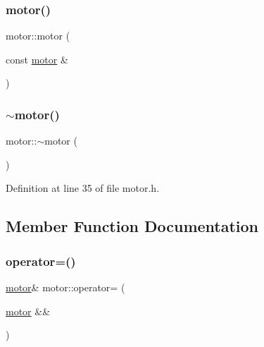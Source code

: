 \subsubsection{\texorpdfstring{motor()}{motor()}\hspace{0.1cm}{\footnotesize\ttfamily [4/4]}}
{\footnotesize\ttfamily motor\+::motor (\begin{DoxyParamCaption}\item[{const \mbox{\hyperlink{classmotor}{motor}} \&}]{ }\end{DoxyParamCaption})\hspace{0.3cm}{\ttfamily [default]}}

\mbox{\label{classmotor_ae7c05cf12983ab16ecdfe8e34c4c7ffa}} 
\subsubsection{\texorpdfstring{$\sim$motor()}{~motor()}}
{\footnotesize\ttfamily motor\+::$\sim$motor (\begin{DoxyParamCaption}{ }\end{DoxyParamCaption})\hspace{0.3cm}{\ttfamily [inline]}}



Definition at line 35 of file motor.\+h.



\subsection{Member Function Documentation}
\mbox{\label{classmotor_a56c0ac07ae4fe630290c25415f36f828}} 
\subsubsection{\texorpdfstring{operator=()}{operator=()}\hspace{0.1cm}{\footnotesize\ttfamily [1/2]}}
{\footnotesize\ttfamily \mbox{\hyperlink{classmotor}{motor}}\& motor\+::operator= (\begin{DoxyParamCaption}\item[{\mbox{\hyperlink{classmotor}{motor}} \&\&}]{ }\end{DoxyParamCaption})\hspace{0.3cm}{\ttfamily [default]}}

